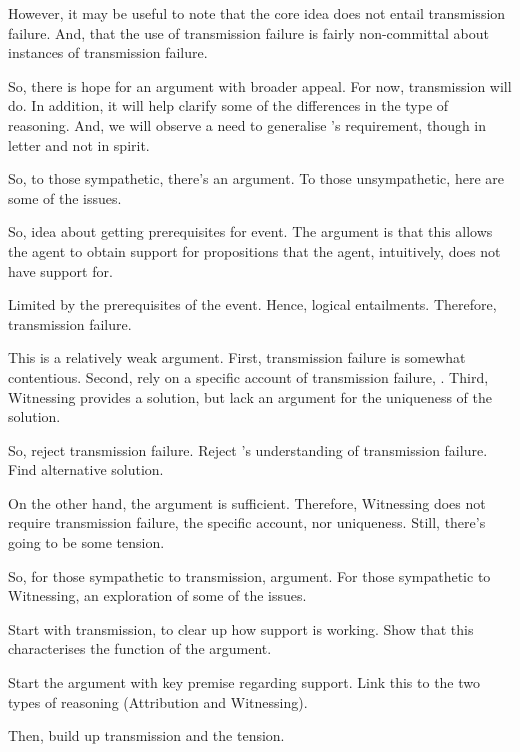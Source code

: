 \documentclass[10pt]{article}
\newcommand{\WR}[0]{\textsf{Witnessing}}
\newcommand{\AR}[0]{\textsf{Attribution}}
\begin{document}
\begin{note}
  However, it may be useful to note that the core idea does not entail transmission failure.
  And, that the use of transmission failure is fairly non-committal about instances of transmission failure.

  So, there is hope for an argument with broader appeal.
  For now, transmission will do.
  In addition, it will help clarify some of the differences in the type of reasoning.
  And, we will observe a need to generalise \citeauthor{Wright:2016wl}'s requirement, though in letter and not in spirit.

  So, to those sympathetic, there's an argument.
  To those unsympathetic, here are some of the issues.
\end{note}


\begin{note}[Goal]
  So, idea about getting prerequisites for event.
  The argument is that this allows the agent to obtain support for propositions that the agent, intuitively, does not have support for.

  Limited by the prerequisites of the event.
  Hence, logical entailments.
  Therefore, transmission failure.

  This is a relatively weak argument.
  First, transmission failure is somewhat contentious.
  Second, rely on a specific account of transmission failure, \citeauthor{Wright:2016wl}.
  Third, \WR{} provides a solution, but lack an argument for the uniqueness of the solution.

  So, reject transmission failure.
  Reject \citeauthor{Wright:2016wl}'s understanding of transmission failure.
  Find alternative solution.

  On the other hand, the argument is sufficient.
  Therefore, \WR{} does not require transmission failure, the specific account, nor uniqueness.
  Still, there's going to be some tension.

  So, for those sympathetic to transmission, argument.
  For those sympathetic to \WR{}, an exploration of some of the issues.
\end{note}

\begin{note}[Outline]
  Start with transmission, to clear up how support is working.
  Show that this characterises the function of the argument.

  Start the argument with key premise regarding support.
  Link this to the two types of reasoning (\AR{} and \WR{}).

  Then, build up transmission and the tension.
\end{note}
\end{document}
